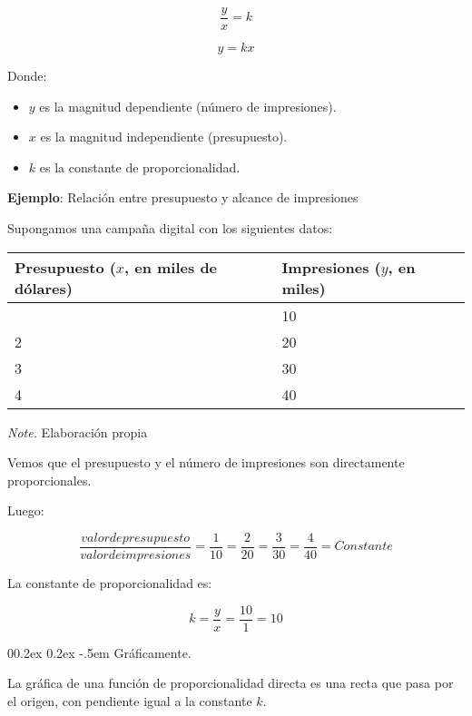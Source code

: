 \documentclass[
  stu,
  floatsintext,
  longtable,
  a4paper,
  nolmodern,
  notxfonts,
  notimes,
  colorlinks=true,linkcolor=blue,citecolor=blue,urlcolor=blue]{apa7}
\makeatletter
\renewcommand{\paragraph}{\@startsection{paragraph}{4}{\parindent}%
	{0\baselineskip \@plus 0.2ex \@minus 0.2ex}%
	{-.5em}%
	{\normalfont\normalsize\bfseries\typesectitle}}
\providecommand{\tightlist}{%
  \setlength{\itemsep}{0pt}\setlength{\parskip}{0pt}}
\makeatother
\begin{document}
\[
\frac{y}{x} = k
\]

\[
y = kx
\]

Donde:

\begin{itemize}
\tightlist
\item
  \(y\) es la magnitud dependiente (número de impresiones).
\item
  \(x\) es la magnitud independiente (presupuesto).
\item
  \(k\) es la constante de proporcionalidad.
\end{itemize}

\textbf{Ejemplo}: Relación entre presupuesto y alcance de impresiones

Supongamos una campaña digital con los siguientes datos:

\begin{table}

{\caption{{Relación entre Presupuesto e
Impresiones}{\label{tbl-mytable2}}}}

\begin{longtable}[]{@{}ll@{}}
\toprule\noalign{}
Presupuesto (\(x\), en miles de dólares) & Impresiones (\(y\), en
miles) \\
\midrule\noalign{}
\endhead
\bottomrule\noalign{}
\endlastfoot
1 & 10 \\
2 & 20 \\
3 & 30 \\
4 & 40 \\
\end{longtable}

{\noindent \emph{Note.} Elaboración propia}

\end{table}

Vemos que el presupuesto y el número de impresiones son directamente
proporcionales.

Luego:

\[
\frac{valor de presupuesto}{valor de impresiones} = \frac{1}{10} = \frac{2}{20} = \frac{3}{30} = \frac{4}{40} = Constante
\]

La constante de proporcionalidad es:

\[
k = \frac{y}{x} = \frac{10}{1} = 10
\]

\paragraph{Gráficamente.}\label{gruxe1ficamente}

La gráfica de una función de proporcionalidad directa es una recta que
pasa por el origen, con pendiente igual a la constante \(k\).
\end{document}
